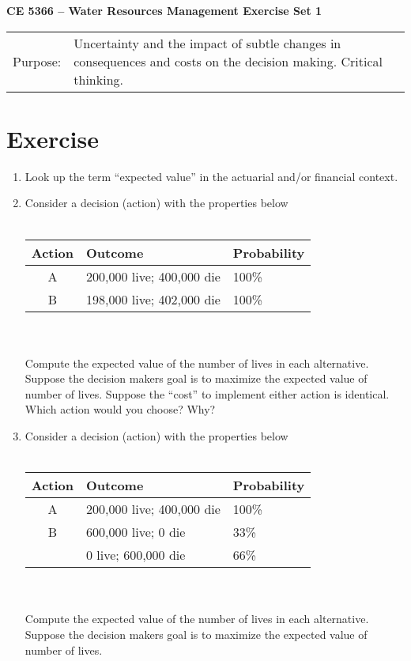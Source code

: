 \documentclass[12pt]{article}
\begin{document}
\begin{center}
{\textbf{{ CE 5366 -- Water Resources Management}  {Exercise Set 1}}}
\end{center}
\begingroup
\begin{tabular}{p{1in} p{5in}}
Purpose: & Uncertainty and the impact of subtle changes in consequences and costs on the decision making. Critical thinking. \\
\end{tabular}
\endgroup
\section*{\small{Exercise}}
\begin{enumerate}
\item Look up the term ``expected value'' in the actuarial and/or financial context.
\item Consider a decision (action) with the properties below \\ ~\\
\begin{tabular}{cll}
Action & Outcome & Probability \\
\hline
\hline
A & 200,000 live; 400,000 die & 100\% \\
B & 198,000 live; 402,000 die & 100\% \\
\end{tabular}\\~\\
Compute the expected value of the number of lives in each alternative.
Suppose the decision makers goal is to maximize the expected value of number of lives.
Suppose the ``cost'' to implement either action is identical.
Which action would you choose? Why?
\item Consider a decision (action) with the properties below \\ ~\\
\begin{tabular}{cll}
Action & Outcome & Probability \\
\hline
\hline
A & 200,000 live; 400,000 die & 100\% \\
B & 600,000 live; 0 die & 33\% \\
~ & 0 live; 600,000 die & 66\% \\
\end{tabular}\\~\\
Compute the expected value of the number of lives in each alternative.
Suppose the decision makers goal is to maximize the expected value of number of lives.

\end{enumerate}
\end{document}
